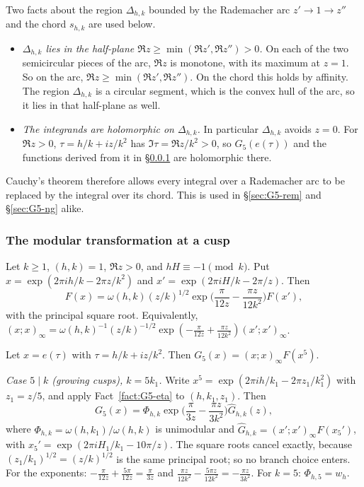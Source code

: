 \begin{remark}\label{rem:G5-deform}
Two facts about the region $\Delta_{h,k}$ bounded by the Rademacher arc $z'\to1\to z''$ and the chord $s_{h,k}$ are used
below.
\begin{itemize}
\item \emph{$\Delta_{h,k}$ lies in the half-plane $\Re z\ge\min(\Re z',\Re z'')>0$.} On each of the two semicircular pieces
of the arc, $\Re z$ is monotone, with its maximum at $z=1$. So on the arc, $\Re z\ge\min(\Re z',\Re z'')$. On the chord
this holds by affinity. The region $\Delta_{h,k}$ is a circular segment, which is the convex hull of the arc, so it lies in
that half-plane as well.
\item \emph{The integrands are holomorphic on $\Delta_{h,k}$.} In particular $\Delta_{h,k}$ avoids $z=0$. For $\Re z>0$,
$\tau=h/k+iz/k^2$ has $\Im\tau=\Re z/k^2>0$, so $G_5(e(\tau))$ and the functions derived from it in
\S\ref{sec:G5-transform} are holomorphic there.
\end{itemize}
Cauchy's theorem therefore allows every integral over a Rademacher arc to be replaced by the integral over its chord.
This is used in \S\ref{sec:G5-rem} and \S\ref{sec:G5-ng} alike.
\end{remark}

\subsubsection{The modular transformation at a cusp}\label{sec:G5-transform}

\begin{fact}\label{fact:G5-eta}
Let $k\ge1$, $(h,k)=1$, $\Re z>0$, and $hH\equiv-1\pmod k$. Put $x=\exp(2\pi ih/k-2\pi z/k^2)$ and
$x'=\exp(2\pi iH/k-2\pi/z)$. Then
\[
F(x)=\omega(h,k)(z/k)^{1/2}\exp\Big(\frac\pi{12z}-\frac{\pi z}{12k^2}\Big)F(x'),
\]
with the principal square root. Equivalently,
$(x;x)_\infty=\omega(h,k)^{-1}(z/k)^{-1/2}\exp(-\frac\pi{12z}+\frac{\pi z}{12k^2})(x';x')_\infty$.
\end{fact}

Let $x=e(\tau)$ with $\tau=h/k+iz/k^2$. Then $G_5(x)=(x;x)_\infty F(x^5)$.

\emph{Case $5\mid k$ (growing cusps), $k=5k_1$.} Write $x^5=\exp(2\pi ih/k_1-2\pi z_1/k_1^2)$ with $z_1=z/5$, and apply
Fact~\ref{fact:G5-eta} to $(h,k_1,z_1)$. Then
\begin{equation}\label{eq:G5-grow}
G_5(x)=\Phi_{h,k}\exp\Big(\frac\pi{3z}-\frac{\pi z}{3k^2}\Big)\hat G_{h,k}(z),
\end{equation}
where $\Phi_{h,k}=\omega(h,k_1)/\omega(h,k)$ is unimodular and $\hat G_{h,k}=(x';x')_\infty F(x_5')$, with
$x_5'=\exp(2\pi iH_1/k_1-10\pi/z)$. The square roots cancel exactly, because $(z_1/k_1)^{1/2}=(z/k)^{1/2}$ is the same
principal root; so no branch choice enters. For the exponents: $-\frac\pi{12z}+\frac{5\pi}{12z}=\frac\pi{3z}$ and
$\frac{\pi z}{12k^2}-\frac{5\pi z}{12k^2}=-\frac{\pi z}{3k^2}$. For $k=5$: $\Phi_{h,5}=w_h$.


